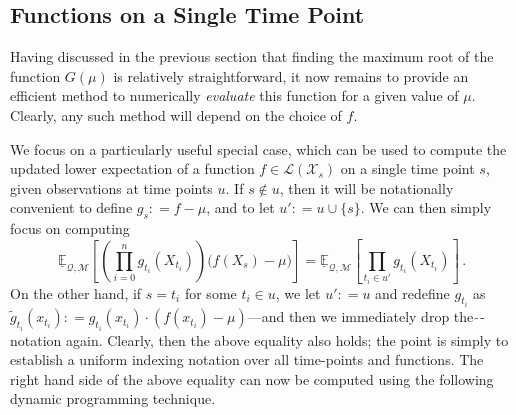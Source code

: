 \documentclass[twoside,11pt]{article}
\newcommand{\states}{\mathcal{X}}
\newcommand{\lexp}{\underline{\mathbb{E}}_{\rateset,\mathcal{M}}}
\newcommand{\gambles}{\mathcal{L}}
\newcommand{\rateset}{\mathcal{Q}}
\newcommand{\coloneqq}{:\!=}
\begin{document}
\subsection{Functions on a Single Time Point}\label{sec:funcs_single_time}

Having discussed in the previous section that finding the maximum root of the function $G(\mu)$ is relatively straightforward, it now remains to provide an efficient method to numerically \emph{evaluate} this function for a given value of $\mu$. Clearly, any such method will depend on the choice of $f$.

We focus on a particularly useful special case, which can be used to compute the updated lower expectation of a function $f\in\gambles(\states_s)$ on a single time point $s$, given observations at time points $u$. If $s\notin u$, then it will be notationally convenient to define $g_s\coloneqq f - \mu$, and to let $u'\coloneqq u\cup \{s\}$. We can then simply focus on computing
\begin{equation*}
\lexp\left[ \left(\prod_{i=0}^ng_{t_i}(X_{t_i})\right)\bigl(f(X_s) - \mu\bigr) \right] = \lexp\left[ \prod_{t_i\in u'}g_{t_i}(X_{t_i})\right]\,.
\end{equation*}
On the other hand, if $s = t_i$ for some $t_i\in u$, we let $u'\coloneqq u$ and redefine $g_{t_i}$ as $\tilde{g}_{t_i}(x_{t_i})\coloneqq g_{t_i}(x_{t_i})\cdot (f(x_{t_i})-\mu)$---and then we immediately drop the $\tilde\,$-notation again. Clearly, then the above equality also holds; the point is simply to establish a uniform indexing notation over all time-points and functions. The right hand side of the above equality can now be computed using the following dynamic programming technique. 
\end{document}
